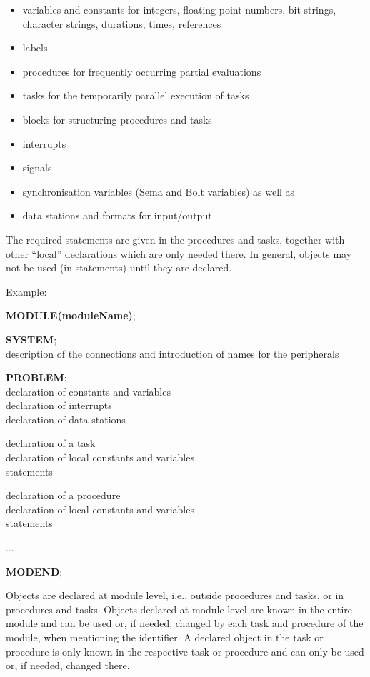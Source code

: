 \begin{itemize}
\item variables and constants for integers, floating point numbers, bit
strings, character strings, durations, times, references
\item labels
\item procedures for frequently occurring partial evaluations
\item tasks for the temporarily parallel execution of tasks
\item blocks for structuring procedures and tasks
\item interrupts
\item signals
\item synchronisation variables (Sema and Bolt variables) as well as
\item data stations and formats for input/output
\end{itemize}

The required statements are given in the procedures and tasks,
together with other ``local'' declarations which are only needed there.
In general, objects may not be used (in statements) until they are
declared.

Example:

{\bf MODULE(moduleName)};

{\bf SYSTEM};\\
\x description of the connections and introduction of names for the
peripherals

{\bf PROBLEM};\\
\x declaration of constants and variables\\
\x declaration of interrupts\\
\x declaration of data stations

\x declaration of a task\\
\x \x declaration of local constants and variables\\
\x \x statements

\x declaration of a procedure\\
\x \x declaration of local constants and variables\\
\x \x statements

...

{\bf MODEND};

Objects are declared at module level, i.e., outside procedures and
tasks, or in procedures and tasks. Objects declared at module level are
known in the entire module and can be used or, if needed, changed by
each task and procedure of the module, when mentioning the identifier.
A declared object in the task or procedure is only known in the
respective task or procedure and can only be used or, if needed,
changed there.

